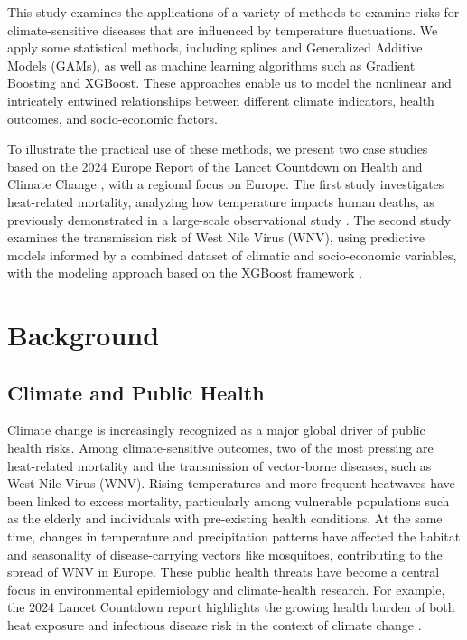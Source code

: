 \documentclass[
]{krantz}
\begin{document}
This study examines the applications of a variety of methods to examine risks for climate-sensitive diseases that are influenced by temperature fluctuations. We apply some statistical methods, including splines and Generalized Additive Models (GAMs), as well as machine learning algorithms such as Gradient Boosting and XGBoost. These approaches enable us to model the nonlinear and intricately entwined relationships between different climate indicators, health outcomes, and socio-economic factors.

To illustrate the practical use of these methods, we present two case studies based on the 2024 Europe Report of the Lancet Countdown on Health and Climate Change \citep{vandaalen2024}, with a regional focus on Europe. The first study investigates heat-related mortality, analyzing how temperature impacts human deaths, as previously demonstrated in a large-scale observational study \citep{gasparrini2015}. The second study examines the transmission risk of West Nile Virus (WNV), using predictive models informed by a combined dataset of climatic and socio-economic variables, with the modeling approach based on the XGBoost framework \citep{chen2016xgboost}.

\section{Background}\label{background}

\subsection{Climate and Public Health}\label{climate-and-public-health}

Climate change is increasingly recognized as a major global driver of public health risks. Among climate-sensitive outcomes, two of the most pressing are heat-related mortality and the transmission of vector-borne diseases, such as West Nile Virus (WNV). Rising temperatures and more frequent heatwaves have been linked to excess mortality, particularly among vulnerable populations such as the elderly and individuals with pre-existing health conditions. At the same time, changes in temperature and precipitation patterns have affected the habitat and seasonality of disease-carrying vectors like mosquitoes, contributing to the spread of WNV in Europe. These public health threats have become a central focus in environmental epidemiology and climate-health research. For example, the 2024 Lancet Countdown report highlights the growing health burden of both heat exposure and infectious disease risk in the context of climate change \citep{vandaalen2024}.
\end{document}
